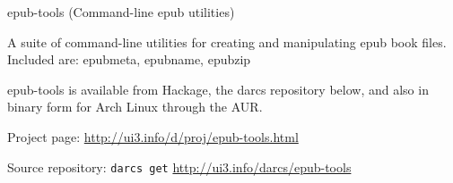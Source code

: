 \begin{hcarentry}{epub-tools (Command-line epub utilities)}
\makeheader

A suite of command-line utilities for creating and manipulating epub book files. Included are: epubmeta, epubname, epubzip

epub-tools is available from Hackage, the darcs repository below, and also in binary form for Arch Linux through the AUR.

\FurtherReading
\begin{compactitem}
\item Project page:
\url{http://ui3.info/d/proj/epub-tools.html}

\item Source repository:
\texttt{darcs get} \url{http://ui3.info/darcs/epub-tools}
\end{compactitem}
\end{hcarentry}
